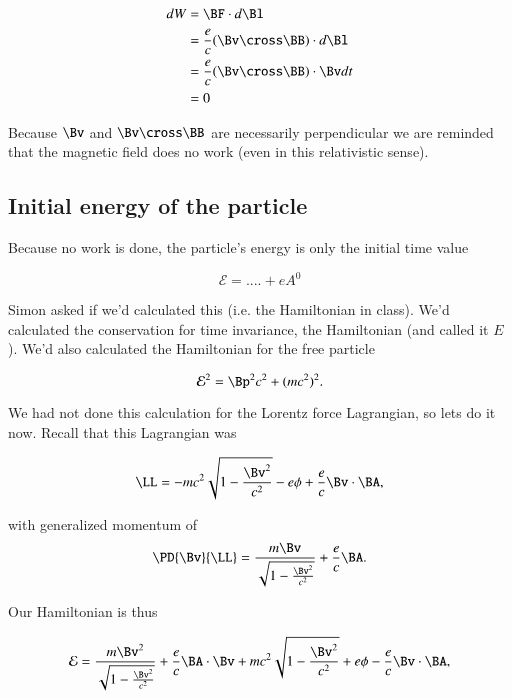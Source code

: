 \begin{align*}
dW &= 
\BF \cdot d\Bl \\
&=
\frac{e}{c} (\Bv \cross \BB) \cdot d\Bl \\
&=
\frac{e}{c} (\Bv \cross \BB) \cdot \Bv dt \\
&= 0
\end{align*}

Because $\Bv$ and $\Bv \cross \BB$ are necessarily perpendicular we are reminded that the magnetic field does no work (even in this relativistic sense).

\subsection{Initial energy of the particle}

Because no work is done, the particle's energy is only the initial time value

\begin{equation}\label{eqn:relativisticElectrodynamicsT3:520}
\mathcal{E} = .... + e A^0
\end{equation}

Simon asked if we'd calculated this (i.e. the Hamiltonian in class).  We'd calculated the conservation for time invariance, the Hamiltonian (and called it $E$).  We'd also calculated the Hamiltonian for the free particle

\begin{equation}\label{eqn:relativisticElectrodynamicsT3:530}
\mathcal{E}^2 = \Bp^2 c^2 + (m c^2)^2.
\end{equation}

We had not done this calculation for the Lorentz force Lagrangian, so lets do it now.  Recall that this Lagrangian was

\begin{equation}\label{eqn:relativisticElectrodynamicsT3:531}
\LL = 
- m c^2 \sqrt{1 - \frac{\Bv^2}{c^2}} - e \phi + \frac{e}{c} \Bv \cdot \BA,
\end{equation}

with generalized momentum of 
\begin{equation}\label{eqn:relativisticElectrodynamicsT3:532}
\PD{\Bv}{\LL} = \frac{m \Bv}{\sqrt{1 - \frac{\Bv^2}{c^2}}} + \frac{e}{c} \BA.
\end{equation}

Our Hamiltonian is thus

\begin{align*}
\mathcal{E} 
= 
\frac{m \Bv^2}{\sqrt{1 - \frac{\Bv^2}{c^2}}} + \frac{e}{c} \BA \cdot \Bv
+ m c^2 \sqrt{1 - \frac{\Bv^2}{c^2}} + e \phi - \frac{e}{c} \Bv \cdot \BA,
\end{align*}

